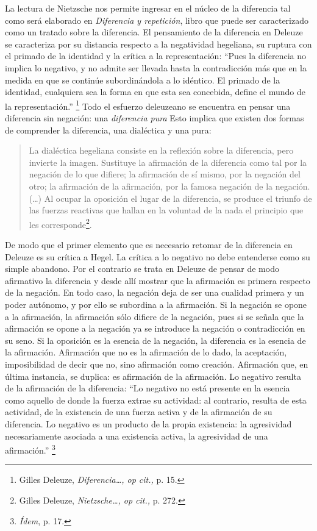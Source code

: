 \documentclass{book}
\begin{document}
La lectura de Nietzsche nos permite ingresar en el núcleo de la
diferencia tal como será elaborado en \emph{Diferencia y repetición},
libro que puede ser caracterizado como un tratado sobre la diferencia.
El pensamiento de la diferencia en Deleuze se caracteriza por su
distancia respecto a la negatividad hegeliana, su ruptura con el primado
de la identidad y la crítica a la representación: \enquote{Pues la diferencia no
implica lo negativo, y no admite ser llevada hasta la contradicción más
que en la medida en que se continúe subordinándola a lo idéntico. El
primado de la identidad, cualquiera sea la forma en que esta sea
concebida, define el mundo de la representación.} \footnote{Gilles
  Deleuze, \emph{Diferencia\ldots, op cit.,} p. 15.} Todo el esfuerzo
deleuzeano se encuentra en pensar una diferencia sin negación: una
\emph{diferencia pura} Esto implica que existen dos formas de
comprender la diferencia, una dialéctica y una pura:

\begin{quote}
La dialéctica hegeliana consiste en la reflexión sobre la diferencia,
pero invierte la imagen. Sustituye la afirmación de la diferencia como
tal por la negación de lo que difiere; la afirmación de sí mismo, por la
negación del otro; la afirmación de la afirmación, por la famosa
negación de la negación. (\dots) Al ocupar la oposición el lugar de
la diferencia, se produce el triunfo de las fuerzas reactivas que hallan
en la voluntad de la nada el principio que les corresponde\footnote{Gilles
  Deleuze, \emph{Nietzsche\ldots, op cit.,} p. 272.}.
\end{quote}

De modo que el primer elemento que es necesario retomar de la diferencia
en Deleuze es su crítica a Hegel. La crítica a lo negativo no debe
entenderse como su simple abandono. Por el contrario se trata en Deleuze
de pensar de modo afirmativo la diferencia y desde allí mostrar que la
afirmación es primera respecto de la negación. En todo caso, la negación
deja de ser una cualidad primera y un poder autónomo, y por ello se
subordina a la afirmación. Si la negación se opone a la afirmación, la
afirmación sólo difiere de la negación, pues si se señala que la
afirmación se opone a la negación ya se introduce la negación o
contradicción en su seno. Si la oposición es la esencia de la negación,
la diferencia es la esencia de la afirmación. Afirmación que no es la
afirmación de lo dado, la aceptación, imposibilidad de decir que no,
sino afirmación como creación. Afirmación que, en última instancia, se
duplica: es afirmación de la afirmación. Lo negativo resulta de la
afirmación de la diferencia: \enquote{Lo negativo no está presente en la esencia
como aquello de donde la fuerza extrae su actividad: al contrario,
resulta de esta actividad, de la existencia de una fuerza activa y de la
afirmación de su diferencia. Lo negativo es un producto de la propia
existencia: la agresividad necesariamente asociada a una existencia
activa, la agresividad de una afirmación.} \footnote{\emph{Ídem}, p. 17.}
\end{document}
